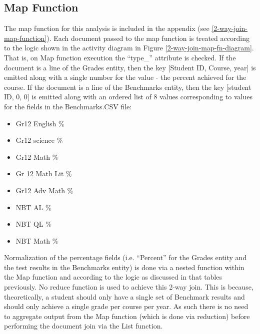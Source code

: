 \subsection{Map Function}
The map function for this analysis is included in the appendix (see \ref{2-way-join-map-function}). Each document passed to the map function is treated according to the logic shown in the activity diagram in Figure \ref{2-way-join-map-fn-diagram}. That is, on Map function execution the ``type\_'' attribute is checked. If the document is a line of the Grades entity, then the key [Student ID, Course, year] is emitted along with a single number for the value - the percent achieved for the course. If the document is a line of the Benchmarks entity, then the key [student ID, 0, 0] is emitted along with an ordered list of 8 values corresponding to values for the fields in the Benchmarks.CSV file:

\begin{itemize}
  \item Gr12 English \%
  \item Gr12 science \%
  \item Gr12 Math \%
  \item Gr 12 Math Lit \%
  \item Gr12 Adv Math \%
  \item NBT AL \%
  \item NBT QL \%
  \item NBT Math \%
\end{itemize}

Normalization of the percentage fields (i.e. ``Percent'' for the Grades entity and the test results in the Benchmarks entity) is done via a nested function within the Map function and according to the logic as discussed in that tables previously. No reduce function is used to achieve this 2-way join. This is because, theoretically, a student should only have a single set of Benchmark results and should only achieve a single grade per course per year. As such there is no need to aggregate output from the Map function (which is done via reduction) before performing the document join via the List function.

